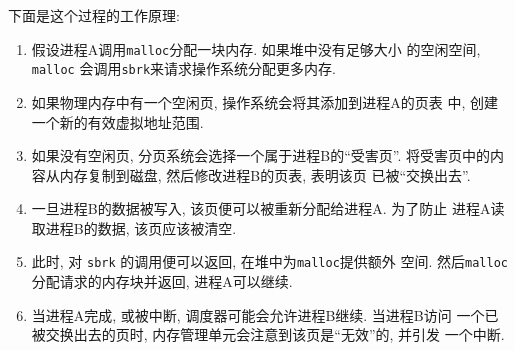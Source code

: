 \documentclass[12pt]{book}
\begin{document}
{%
下面是这个过程的工作原理:

\begin{enumerate}

\item 假设进程A调用{\tt malloc}分配一块内存. 如果堆中没有足够大小
的空闲空间, {\tt malloc} 会调用{\tt sbrk}来请求操作系统分配更多内存.

\item 如果物理内存中有一个空闲页, 操作系统会将其添加到进程A的页表
中, 创建一个新的有效虚拟地址范围.

\item 如果没有空闲页, 分页系统会选择一个属于进程B的``受害页''. 将受害页中的内容从内存复制到磁盘, 然后修改进程B的页表, 表明该页
已被``交换出去''.

\item 一旦进程B的数据被写入, 该页便可以被重新分配给进程A. 为了防止
进程A读取进程B的数据, 该页应该被清空.

\item 此时, 对 {\tt sbrk} 的调用便可以返回, 在堆中为{\tt malloc}提供额外
空间. 然后{\tt malloc} 分配请求的内存块并返回, 进程A可以继续. 

\item 当进程A完成, 或被中断, 调度器可能会允许进程B继续. 当进程B访问
一个已被交换出去的页时, 内存管理单元会注意到该页是``无效''的, 并引发
一个中断.


\end{enumerate}}
\end{document}
